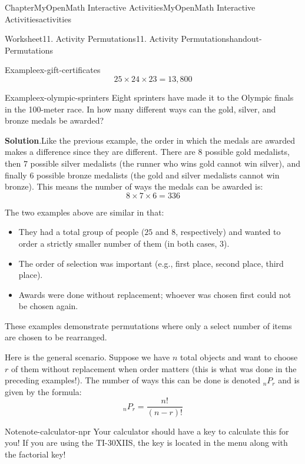 \documentclass[oneside,10pt,]{book}
\newcommand{\blocktitlefont}{\relax}
\newcommand{\ptxlistdisc}{\raisebox{0.3ex}{\textbullet}}
\newcommand{\kbd}[1]{\keys{{#1}}}
\begin{document}
\begin{chapterptx}{Chapter}{MyOpenMath Interactive Activities}{}{MyOpenMath Interactive Activities}{}{}{activities}
\begin{worksheet-section}{Worksheet}{11. Activity Permutations}{}{11. Activity Permutations}{}{}{handout-Permutations}
\begin{example}{Example}{}{ex-gift-certificates}
\begin{equation*}
25 \times 24 \times 23 = 13,800
\end{equation*}
%
\end{example}
\begin{example}{Example}{}{ex-olympic-sprinters}%
Eight sprinters have made it to the Olympic finals in the 100-meter race. In how many different ways can the gold, silver, and bronze medals be awarded?%
\par\smallskip%
\noindent\textbf{\blocktitlefont Solution}.\hypertarget{ex-olympic-sprinters-2}{}\quad{}Like the previous example, the order in which the medals are awarded makes a difference since they are different. There are \(8\) possible gold medalists, then \(7\) possible silver medalists (the runner who wins gold cannot win silver), and finally \(6\) possible bronze medalists (the gold and silver medalists cannot win bronze). This means the number of ways the medals can be awarded is:%
\begin{equation*}
8 \times 7 \times 6 = 336
\end{equation*}
%
\end{example}
The two examples above are similar in that:%
\begin{itemize}[label=\ptxlistdisc]
\item{}They had a total group of people (\(25\) and \(8\), respectively) and wanted to order a strictly smaller number of them (in both cases, \(3\)).%
\item{}The order of selection was important (e.g., first place, second place, third place).%
\item{}Awards were done without replacement; whoever was chosen first could not be chosen again.%
\end{itemize}
These examples demonstrate permutations where only a select number of items are chosen to be rearranged.%
\par
Here is the general scenario. Suppose we have \(n\) total objects and want to choose \(r\) of them without replacement when order matters (this is what was done in the preceding examples!). The number of ways this can be done is denoted \(_nP_r\) and is given by the formula:%
\begin{equation*}
_nP_r = \frac{n!}{(n-r)!}
\end{equation*}
%
\begin{note}{Note}{}{note-calculator-npr}%
Your calculator should have a key to calculate this for you! If you are using the TI-30XIIS, the key is located in the \kbd{PRB} menu along with the factorial key!%

\end{note}
\end{worksheet-section}
\end{chapterptx}
\end{document}
